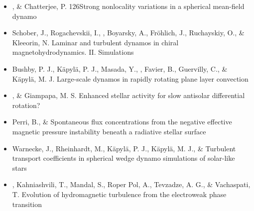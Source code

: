 \begin{itemize}
\item[{365.}~]
\Brandenburg, \& Chatterjee, P.
{126}{Strong nonlocality variations in a spherical mean-field dynamo}

\item[{364.}~]
Schober, J., Rogachevskii, I., \Brandenburg, Boyarsky, A., Fr\"ohlich, J., Ruchayskiy, O., \& Kleeorin, N.
{Laminar and turbulent dynamos in chiral magnetohydrodynamics. II. Simulations}

\item[{363.}~]
Bushby, P. J., K\"apyl\"a, P. J., Masada, Y., \Brandenburg, Favier, B., Guervilly, C., \& K\"apyl\"a, M. J.
{Large-scale dynamos in rapidly rotating plane layer convection}

\item[{362.}~]
\Brandenburg, \& Giampapa, M. S.
{Enhanced stellar activity for slow antisolar differential rotation?}

\item[{361.}~]
Perri, B., \& \Brandenburg{}
{Spontaneous flux concentrations from the negative effective magnetic pressure instability beneath a radiative stellar surface}

\item[{360.}~]
Warnecke, J., Rheinhardt, M., K\"apyl\"a, P. J., K\"apyl\"a, M. J., \& \Brandenburg{}
{Turbulent transport coefficients in spherical wedge dynamo simulations of solar-like stars}

\item[{359.}~]
\Brandenburg, Kahniashvili, T., Mandal, S., Roper Pol, A., Tevzadze, A. G., \& Vachaspati, T.
{Evolution of hydromagnetic turbulence from the electroweak phase transition}


\end{itemize}
